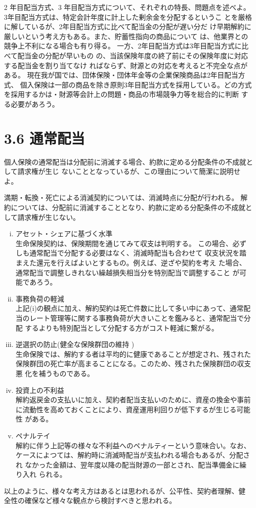 \documentclass[report,gutter=10mm,fore-edge=10mm,uplatex,dvipdfmx]{jlreq}
\begin{document}
2 年目配当方式、3 年目配当方式について、それぞれの特長、問題点を述べよ。
3年目配当方式は、特定会計年度に計上した剰余金を分配するというこ
とを厳格に解しているが、2年目配当方式に比べて配当金の分配が遅い分だ
け早期解約に厳しいという考え方もある。また、貯蓄性指向の商品について
は、他業界との競争上不利になる場合も有り得る。
一方、2年目配当方式は3年目配当方式に比べて配当金の分配が早いもの
の、当該保険年度の終了前にその保険年度に対応する配当金を割り当てなけ
ればならず、財源との対応を考えると不完全な点がある。
現在我が国では、団体保険・団体年金等の企業保険商品は2年目配当方式、
個入保険は一部の商品を除き原則3年目配当方式を採用している。どの方式
を採用するかは・財源等会計上の問題・商品の市場競争力等を総合的に判断
する必要があろう。

\section{3.6 通常配当}
個人保険の通常配当は分配前に消滅する場合、約款に定める分配条件の不成就として請求権が生じ
ないこととなっているが、この理由について簡潔に説明せよ。


満期・転換・死亡による消滅契約については、消滅時点に分配が行われる。
解約については、分配前に消滅することとなり、約款に定める分配条件の不成就として請求権が生じない。

\begin{enumerate} [(i)]
 \item アセット・シェアに基づく水準\\
 生命保険契約は、保険期間を通じてみて収支は判明する。
 この場合、必ずしも通常配当で分配する必要はなく、消滅時配当も合わせて
 収支状況を踏まえた還元を行えばよいとするもの。例えば、逆ざや契約を考え
 た場合、通常配当で調整しきれない繰越損失相当分を特別配当で調整すること
 が可能であろう。
 \item  事務負荷の軽減\\
 上記(i)の観点に加え、解約契約は死亡件数に比して多い中にあって、通常配
 当のレート管理等に関する事務負荷が大きいことを鑑みると、通常配当で分配
 するよりも特別配当として分配する方がコスト軽減に繋がる。
 \item  逆選択の防止(健全な保険群団の維持 )\\
 生命保険では、解約する者は平均的に健康であることが想定され、残された
 保険群団の死亡率が高まることになる。このため、残された保険群団の収支悪
 化を補うものである。
 \item  投資上の不利益\\
 解約返戻金の支払いに加え、契約者配当支払いのために、資産の換金や事前
 に流動性を高めておくことにより、資産運用利回りが低下するが生じる可能性
 がある。
 \item  ペナルテイ\\
 解約に伴う上記等の様々な不利益へのペナルティーという意味合い。なお、
 ケースによつては、解約時に消滅時配当が支払われる場合もあるが、分配され
 なかった金額は、翌年度以降の配当財源の一部とされ、配当準備金に繰り入れ
 られる。
\end{enumerate}
以上のように、様々な考え方はあるとは思われるが、公平性、契約者理解、健
全性の確保など様々な観点から検討すべきと思われる。
\end{document}
